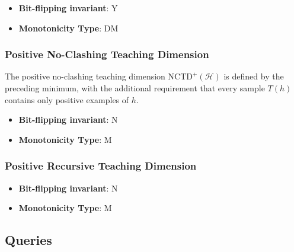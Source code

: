       \begin{definition}\label{def:monotonic_projected_minimum_teaching_set_size}
      
      \end{definition}
      \begin{itemize}
      \item {\bf Bit-flipping invariant}: Y
      \item {\bf Monotonicity Type}: DM
      \end{itemize}
\subsubsection{Positive No-Clashing Teaching Dimension}
      
      \begin{definition}\label{def:positive_no-clashing_teaching_dimension}
      The positive no-clashing teaching dimension
      $\mathrm{NCTD}^{+}(\mathcal H)$ is defined by the preceding minimum,
      with the additional requirement that every sample $T(h)$ contains only
      positive examples of $h$.
      \end{definition}
      \begin{itemize}
      \item {\bf Bit-flipping invariant}: N
      \item {\bf Monotonicity Type}: M
      \end{itemize}
\subsubsection{Positive Recursive Teaching Dimension}
      
      \begin{definition}\label{def:positive_recursive_teaching_dimension}
      
      \end{definition}
      \begin{itemize}
      \item {\bf Bit-flipping invariant}: N
      \item {\bf Monotonicity Type}: M
      \end{itemize}
\subsection{Queries}\label{sec:Queries}
